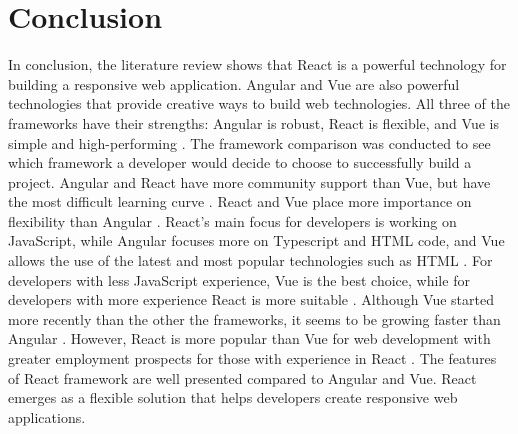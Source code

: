 \documentclass[10pt,journal,compsoc]{IEEEtran}
\begin{document}
\section{Conclusion}
In conclusion, the literature review shows that React is a powerful technology for building a responsive web application. Angular and Vue are also powerful technologies that provide creative ways to build web technologies. All three of the frameworks have their strengths: Angular is robust, React is flexible, and Vue is simple and high-performing \cite{vyas2022comparative}. The framework comparison was conducted to see which framework a developer would decide to choose to successfully build a project. Angular and React have more community support than Vue, but have the most difficult learning curve \cite{cincovic2020comparison}. React and Vue place more importance on flexibility than Angular
\cite{wohlgethan2018supportingweb}. React's main focus for developers is working on JavaScript, while Angular focuses more on Typescript and HTML code, and Vue allows the use of the latest and most popular technologies such as HTML \cite{wohlgethan2018supportingweb}. For developers with less JavaScript experience, Vue is the best choice, while for developers with more experience React is more suitable \cite{cincovic2020comparison}. Although Vue started more recently than the other the frameworks, it seems to be growing faster than Angular \cite{vyas2022comparative}. However, React is more popular than Vue for web development with greater employment prospects for those with experience in React \cite{meredova2023comparison}. The features of React framework are well presented compared to Angular and Vue. React emerges as a flexible solution that helps developers create responsive web applications.

\printbibliography
\end{document}
